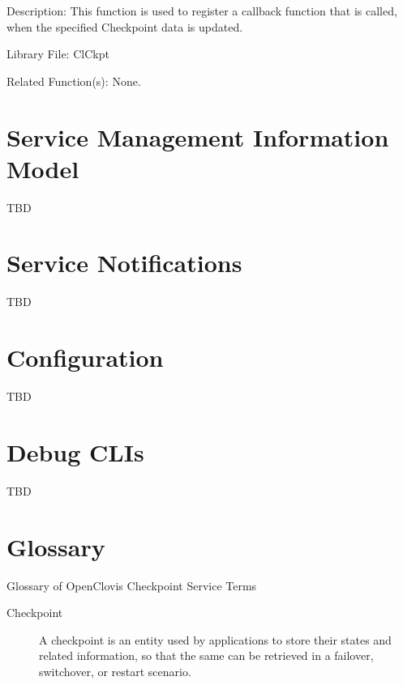 \begin{flushleft}
\begin{Desc}
\begin{description}
\end{description}
\end{Desc}
\begin{Desc}
\item[Description:]This function is used to register a callback function that is called, when the specified Checkpoint data is updated.\end{Desc}
\begin{Desc}
\item[Library File:]Cl\-Ckpt\end{Desc}
\begin{Desc}
\item[Related Function(s):]None. \end{Desc}



\chapter{Service Management Information Model}
TBD

\chapter{Service Notifications}
TBD

\chapter{Configuration}
TBD


\chapter{Debug CLIs}
TBD

\chapter*{Glossary}
\begin{Desc}
\item[Glossary of OpenClovis Checkpoint Service Terms]
\begin{description}

\item[Checkpoint] A checkpoint is an entity used by applications to store their states 
            and related information, so that the same can be retrieved in a failover, switchover, or restart scenario.
 \end{description}
\begin{description}


\end{description}
\end{Desc}
\end{flushleft}
